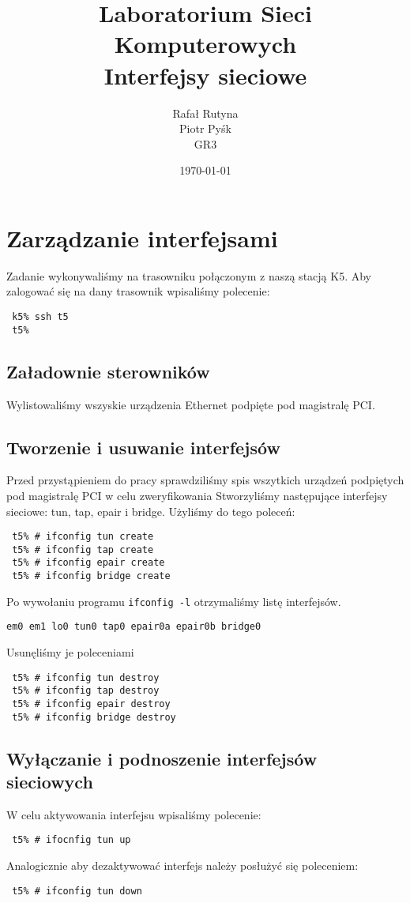 \documentclass[a4paper,11pt,notitlepage]{article}
\author{Rafał Rutyna \\ Piotr Pyśk \\ GR3}
\title{Laboratorium Sieci Komputerowych \\ {\small Interfejsy sieciowe}}
\date{\today}
\begin{document}
\maketitle
\newpage
\tableofcontents
\newpage

\section{Zarządzanie interfejsami}
Zadanie wykonywaliśmy na trasowniku połączonym z naszą stacją K5. Aby zalogować się na dany trasownik wpisaliśmy polecenie:
\begin{verbatim}
 k5% ssh t5
 t5%
\end{verbatim}

\subsection{Załadownie sterowników}
Wylistowaliśmy wszyskie urządzenia Ethernet podpięte pod magistralę PCI.

\subsection{Tworzenie i usuwanie interfejsów}
Przed przystąpieniem do pracy sprawdziliśmy spis wszytkich urządzeń podpiętych pod magistralę PCI w celu zweryfikowania 
Stworzyliśmy następujące interfejsy sieciowe: tun, tap, epair i bridge.
Użyliśmy do tego poleceń:
\begin{verbatim}
 t5% # ifconfig tun create
 t5% # ifconfig tap create
 t5% # ifconfig epair create
 t5% # ifconfig bridge create
\end{verbatim}
Po wywołaniu programu \verb+ifconfig -l+ otrzymaliśmy listę interfejsów.
\begin{verbatim}
em0 em1 lo0 tun0 tap0 epair0a epair0b bridge0 
\end{verbatim}
Usunęliśmy je poleceniami
\begin{verbatim}
 t5% # ifconfig tun destroy
 t5% # ifconfig tap destroy
 t5% # ifconfig epair destroy
 t5% # ifconfig bridge destroy
\end{verbatim}

\subsection{Wyłączanie i podnoszenie interfejsów sieciowych}
W celu aktywowania interfejsu wpisaliśmy polecenie:
\begin{verbatim}
 t5% # ifocnfig tun up
\end{verbatim}
Analogicznie aby dezaktywować interfejs należy posłużyć się poleceniem:
\begin{verbatim}
 t5% # ifconfig tun down
\end{verbatim}
\end{document}
